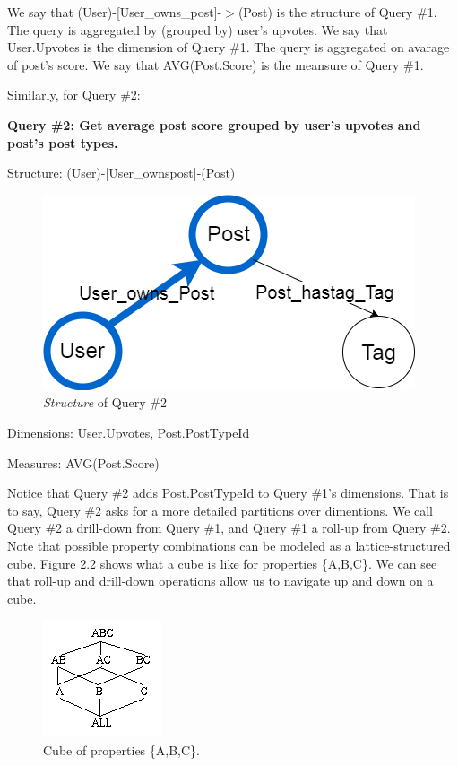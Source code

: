 We say that (User)-[User\_owns\_post]-$>$(Post) is the structure of Query \#1.
The query is aggregated by (grouped by) user’s upvotes. We say that {User.Upvotes} is the dimension of Query \#1.
The query is aggregated on avarage of post’s score.  We say that {AVG(Post.Score)} is the meansure of Query \#1. 
 
Similarly, for Query \#2:

\textbf{Query \#2: 		Get average post score grouped by user’s upvotes and post’s post types. }

Structure:	(User)-[User\_ownspost]-(Post)

\begin {figure}[H]
\centering
\includegraphics[scale=0.5]{pic/meta1.png}
\caption{\textit{Structure} of Query \#2}
\end{figure}

Dimensions:	{User.Upvotes, Post.PostTypeId}

Measures:	{AVG(Post.Score)}
 
Notice that Query \#2 adds Post.PostTypeId to Query \#1’s dimensions. That is to say, Query \#2 asks for a more detailed partitions over dimentions. We call Query \#2 a drill-down from Query \#1, and  Query \#1 a roll-up from Query \#2. Note that possible property combinations can be modeled as a lattice-structured cube. Figure 2.2 shows what a cube is like for properties \{A,B,C\}. We can see that roll-up and drill-down operations allow us to navigate up and down on a cube.


\begin {figure}[H]
\centering
\includegraphics[scale=1]{pic/22.png}
\caption{Cube of properties \{A,B,C\}.}
\end{figure}

